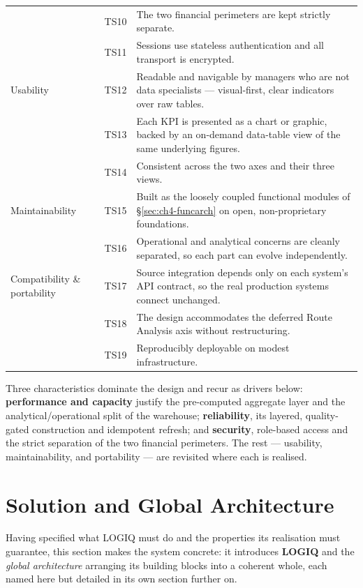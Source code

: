 \begin{xltabular}{\linewidth}{|>{\raggedright\arraybackslash}p{3.6cm}|>{\centering\arraybackslash}p{1.0cm}|>{\raggedright\arraybackslash}X|}
 & TS10 & The two financial perimeters are kept strictly separate. \\
 & TS11 & Sessions use stateless authentication and all transport is encrypted. \\
\hline
Usability & TS12 &
Readable and navigable by managers who are not data specialists --- visual-first, clear indicators over raw tables. \\
 & TS13 & Each KPI is presented as a chart or graphic, backed by an on-demand data-table view of the same underlying figures. \\
 & TS14 & Consistent across the two axes and their three views. \\
\hline
{} Maintainability & TS15 &
Built as the loosely coupled functional modules of \S\ref{sec:ch4-funcarch} on open, non-proprietary foundations. \\
 & TS16 & Operational and analytical concerns are cleanly separated, so each part can evolve independently. \\
\hline
Compatibility \& portability & TS17 &
Source integration depends only on each system's API contract, so the real production systems connect unchanged. \\
 & TS18 & The design accommodates the deferred Route Analysis axis without restructuring. \\
 & TS19 & Reproducibly deployable on modest infrastructure. \\
\end{xltabular}
\endgroup

Three characteristics dominate the design and recur as drivers below: \textbf{performance and
capacity} justify the pre-computed aggregate layer and the analytical/operational split of the
warehouse; \textbf{reliability}, its layered, quality-gated construction and idempotent refresh; and
\textbf{security}, role-based access and the strict separation of the two financial perimeters. The
rest --- usability, maintainability, and portability --- are revisited where each is realised.

\section{Solution and Global Architecture}
\label{sec:ch4-solution}

Having specified what LOGIQ must do and the properties its realisation must guarantee, this section makes
the system concrete: it introduces \textbf{LOGIQ} and the \emph{global architecture} arranging its
building blocks into a coherent whole, each named here but detailed in its own section further on.

